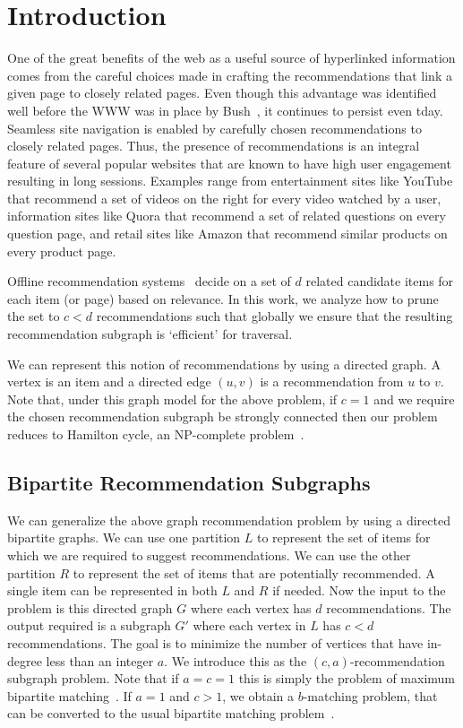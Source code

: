 
\section{Introduction}

One of the great benefits of the web as a useful source of hyperlinked
information comes from the careful choices made in crafting the recommendations
that link a given page to closely related pages. Even though this advantage was
identified well before the WWW was in place by Bush~\cite{Bush45}, it continues
to persist even tday. Seamless site navigation is enabled by carefully chosen
recommendations to closely related pages. Thus, the presence of recommendations
is an integral feature of several popular websites that are known to have high
user engagement resulting in long sessions. Examples range from 
entertainment sites like YouTube that recommend a set of videos on the right
for every video watched by a user, information sites like Quora that recommend
a set of related questions on every question page, and retail sites like Amazon
that recommend similar products on every product page. \vs

Offline recommendation systems~\cite{Schafer1999, Adomavicius2005, Resnick1997}
decide on a set of $d$ related candidate items for each item (or page) based 
on relevance. In this work, 
we analyze how to prune the set to $c < d$ recommendations 
such that globally we ensure that the resulting recommendation subgraph is 
`efficient' for traversal.\vs

We can represent this notion of recommendations by using a directed graph. A
vertex is an item and a directed edge $(u, v)$ is a recommendation from
$u$ to $v$. Note that, under this graph model for the above problem, if $c=1$ and we
require the chosen recommendation subgraph be strongly connected then our
problem reduces to Hamilton cycle, an NP-complete problem~\cite{CLRS2001}. \vs

\subsection{Bipartite Recommendation Subgraphs}

We can generalize the above graph recommendation problem by using a
directed bipartite graphs. We can use one partition $L$ to represent
the set of items for which we are required to suggest
recommendations. We can use the other partition $R$ to represent the
set of items that are potentially recommended. A single item
can be represented in both $L$ and $R$ if needed.  Now the input to
the problem is this directed graph $G$ where each vertex has $d$
recommendations. The output required is a subgraph $G'$ where each
vertex in $L$ has $c < d$ recommendations. The goal is to
minimize the number of vertices that have in-degree less than an
integer $a$. We introduce this as the $(c, a)$-recommendation subgraph
problem.  Note that if $a=c=1$ this is simply the problem of maximum
bipartite matching~\cite{LovaszPlummer1986}. If $a=1$ and $c > 1$,
we obtain a $b$-matching problem, that can be converted to the
usual bipartite matching problem~\cite{Gabow1983}.

